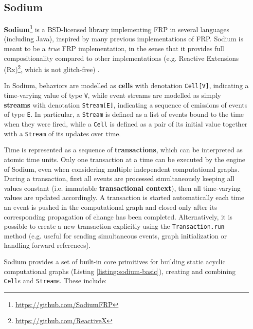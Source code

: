 
\subsection{Sodium}

\textbf{Sodium}\footnote{\url{https://github.com/SodiumFRP}} is a
BSD-licensed library implementing \ac{FRP} in several languages (including
Java), inspired by many previous implementations of \ac{FRP}. Sodium
is meant to be a \textit{true} \ac{FRP} implementation, in the sense that it
provides full compositionality compared to other implementations (e.g. Reactive
Extensions (Rx)\footnote{\url{https://github.com/ReactiveX}}, which is not
glitch-free) \cite{FRP}.

In Sodium, behaviors are modelled as \textbf{cells} with denotation
\texttt{Cell[V]}, indicating a time-varying value of type \texttt{V}, while
event streams are modelled as simply \textbf{streams} with denotation
\texttt{Stream[E]}, indicating a sequence of emissions of events of type
\texttt{E}. In particular, a \texttt{Stream} is defined as a list of events
bound to the time when they were fired, while a \texttt{Cell} is defined as a
pair of its initial value together with a \texttt{Stream} of its updates over
time.

Time is represented as a sequence of \textbf{transactions}, which can be
interpreted as atomic time units. Only one transaction at a time can be
executed by the engine of Sodium, even when considering multiple independent
computational graphs. During a transaction, first all events are processed
simultaneously keeping all values constant (i.e. immutable
\textbf{transactional context}), then all time-varying values are updated
accordingly. A transaction is started automatically each time an event is
pushed in the computational graph and closed only after its corresponding
propagation of change has been completed. Alternatively, it is possible to
create a new transaction explicitly using the \texttt{Transaction.run} method
(e.g. useful for sending simultaneous events, graph initialization or handling
forward references).

Sodium provides a set of built-in core primitives for building static acyclic
computational graphs (Listing \ref{listing:sodium-basic}), creating and
combining \texttt{Cell}s and \texttt{Stream}s. These include:

